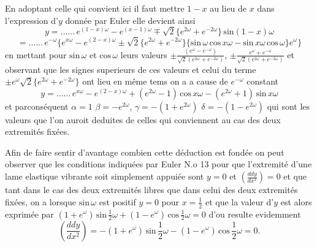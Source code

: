 \documentclass[11pt,a4paper]{article}
\begin{document}
En adoptant celle qui convient ici il faut mettre $1-x$ au
lieu de $x$ dans l'expression d'$y$ donnée par Euler elle
devient ainsi
\[ y = \ldots\ldots\, e^{(1-x)\omega} - e^{(x-1)\omega} \mp \sqrt{2}\{e^{2\omega}+e^{-2\omega}\}\,\text{sin}(1-x)\omega \]
\[ = \ldots\ldots\, e^{-\omega}\{e^{x\omega} - e^{(2-x)\omega} \pm \sqrt{2}\{e^{2\omega}+e^{-2\omega}\}\{\text{sin}\,\omega\,\text{cos}\,x\omega - \text{sin}\,x\omega\,\text{cos}\,\omega\}e^{\omega}\} \]
 en mettant pour $\text{sin}\,\omega$ et $\text{cos}\,\omega$ leurs valeurs
$\pm\frac{(e^{\omega}-e^{-\omega})}{\sqrt{2}(e^{2\omega}+e^{-2\omega})}$, $\pm\frac{e^{\omega}+e^{-\omega}}{\sqrt{2}(e^{2\omega}+e^{-2\omega})}$ et observant que les signes superieurs
de ces valeurs et celui du terme $\pm e^{\omega}\sqrt{2}\{e^{2\omega}+e^{-2\omega}\}$ ont lieu
en même tems on a a cause de $e^{-\omega}$ constant
\[ y = \ldots\ldots\, e^{x\omega} - e^{(2-x)\omega} + (e^{2\omega}-1)\,\text{cos}\,x\omega - (e^{2\omega}+1)\,\text{sin}\,x\omega \]
et parconséquent $\alpha = 1$ $\beta = -e^{2\omega}$, $\gamma = -(1+e^{2\omega})$ $\delta = -(1-e^{2\omega})$
qui sont les valeurs que l'on auroit deduites de celles qui conviennent
au cas des deux extremités fixées.

Afin de faire sentir d'avantage combien cette déduction est fondée
on peut observer que les conditions indiquées par Euler N.o 13
pour que l'extremité d'une lame elastique vibrante soit simplement
appuiée sont $y = 0$ et $\left(\frac{ddy}{dx^2}\right) = 0$  et que
tant dans le cas des deux extremités libres que dans celui
des deux extremités fixées, on a lorsque $\text{sin}\,\omega$ est positif
$y = 0$ pour $x = \frac{1}{2}$ et que la valeur d'$y$ est alors exprimée
par $(1+e^{\omega})\,\text{sin}\,\frac{1}{2}\omega + (1-e^{\omega})\,\text{cos}\,\frac{1}{2}\omega = 0$ d'ou resulte evidemment
\[ \left(\frac{ddy}{dx^2}\right) = -(1+e^{\omega})\,\text{sin}\,\frac{1}{2}\omega - (1-e^{\omega})\,\text{cos}\,\frac{1}{2}\omega = 0. \]
\end{document}
